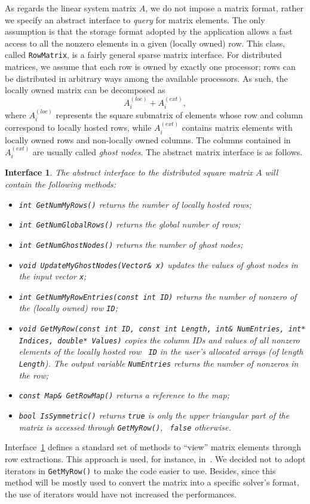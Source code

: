 \documentclass[acmtocl]{acmtrans2m}
\newtheorem{interface}{Interface}[section]
\begin{document}
As regards the linear system matrix $A$, we do not impose a matrix format,
rather we specify an abstract interface to {\sl query} for matrix elements. 
The only assumption is
that the storage format adopted by the application allows a fast access to all
the nonzero elements in a given (locally owned) row.
This class, called {\tt RowMatrix}, is a fairly general sparse matrix 
interface. For
distributed matrices, we assume that each row is owned by exactly
one processor; rows can be distributed in arbitrary ways among the available
processors. As such, the locally owned matrix can be decomposed as
\begin{equation}
A^{(loc)}_i + A^{(ext)}_i,
\end{equation}
where $A^{(loc)}_i$ represents the square submatrix of elements whose row
and column correspond to locally hosted rows, while
$A^{(ext)}_i$ contains matrix elements with locally owned rows and
non-locally owned columns. The
columns contained in $A_i^{(ext)}$ are usually called {\sl ghost nodes}.
The abstract matrix interface is as
follows.
\begin{interface}
\label{int:ami}
The abstract interface to the distributed square matrix $A$
will contain the following methods:
\begin{itemize}
\item \verb!int GetNumMyRows()! returns the number of locally hosted rows;
\item \verb!int GetNumGlobalRows()! returns the global number of rows;
\item \verb!int GetNumGhostNodes()! returns the number of ghost nodes;
\item \verb!void UpdateMyGhostNodes(Vector& x)! updates the values of ghost nodes
 in the input vector {\tt x};
\item {\tt int GetNumMyRowEntries(const int ID)} returns the number of nonzero of
the (locally owned) row {\tt ID};
\item {\tt void GetMyRow(const int ID, const int Length, int\& NumEntries, int* Indices, double*
                             Values)} copies the
column IDs and values of all nonzero elements of the locally hosted row {\tt
  ID} in the user's allocated arrays (of length {\tt Length}). The output
  variable {\tt NumEntries} returns the number of nonzeros in the row;
\item \verb!const Map& GetRowMap()! returns a reference to the map;
\item \verb!bool IsSymmetric()! returns {\tt true} is only the upper
triangular part of the matrix is accessed through {\tt GetMyRow()}, {\tt
  false} otherwise.
\end{itemize}
\end{interface}
Interface~\ref{int:ami} defines a standard set of methods to ``view'' matrix
elements through row extractions. This approach is used, 
for instance,
in~\cite{Epetra-Ref-Guide,ml-guide,duff02overview,lujan00oolala}. We decided
not to adopt iterators in {\tt GetMyRow()} to make the code easier to use.
Besides, since this method will be mostly used to convert the matrix into a
specific solver's format, the use of iterators would have not increased the
performances.
\end{document}
